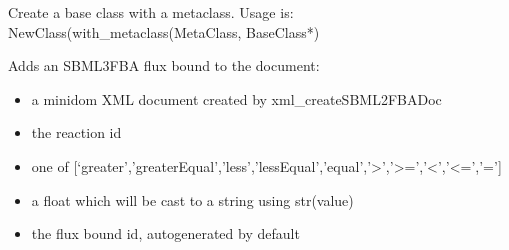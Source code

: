 \documentclass[letterpaper,10pt,english]{sphinxmanual}
\begin{document}

\begin{fulllineitems}
\label{\detokenize{modules_doc:cbmpy.CBXML.with_metaclass}}
\pysigstartsignatures
{}
\pysigstopsignatures
\sphinxAtStartPar
Create a base class with a metaclass.
Usage is: NewClass(with\_metaclass(MetaClass, BaseClass*)

\end{fulllineitems}


\begin{fulllineitems}
\label{\detokenize{modules_doc:cbmpy.CBXML.xml_addSBML2FBAFluxBound}}
\pysigstartsignatures
{}
\pysigstopsignatures
\sphinxAtStartPar
Adds an SBML3FBA flux bound to the document:
\begin{itemize}
\item {} 
\sphinxAtStartPar
{} a minidom XML document created by xml\_createSBML2FBADoc

\item {} 
\sphinxAtStartPar
{} the reaction id

\item {} 
\sphinxAtStartPar
{} one of {[}‘greater’,’greaterEqual’,’less’,’lessEqual’,’equal’,’\textgreater{}’,’\textgreater{}=’,’\textless{}’,’\textless{}=’,’=’{]}

\item {} 
\sphinxAtStartPar
{} a float which will be cast to a string using str(value)

\item {} 
\sphinxAtStartPar
{} the flux bound id, autogenerated by default

\end{itemize}

\end{fulllineitems}
\end{document}
